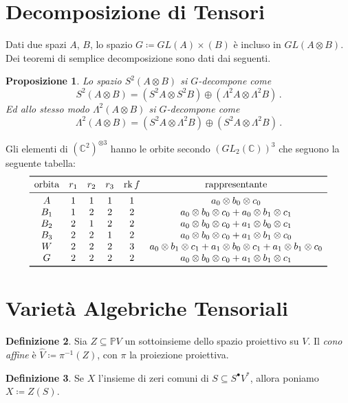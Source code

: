 \documentclass[a4paper, 11pt]{article}
\theoremstyle{definition}
\newtheorem{Def}{Definizione}[section]
\theoremstyle{plain}
\newtheorem{Prop}[Def]{Proposizione}
\newcommand{\PP}{\mathbb{P}}
\newcommand{\C}{\mathbb{C}}
\newcommand{\deff}{\coloneqq}
\DeclareMathOperator{\rk}{rk}
\begin{document}
\section{Decomposizione di Tensori}

Dati due spazi $A$, $B$, lo spazio $G \deff GL(A) \times (B)$ è incluso in $GL(A\otimes B)$. Dei teoremi di semplice decomposizione sono dati dai seguenti.
\begin{Prop}
	Lo spazio $S^2(A\otimes B)$ si $G$-decompone come
	\[
		S^2(A \otimes B) = (S^2A \otimes S^2B) \oplus (\Lambda^2A \otimes \Lambda^2B)\,.
	\]
	Ed allo stesso modo $\Lambda^2(A\otimes B)$ si $G$-decompone come
	\[
		\Lambda^2(A\otimes B) = (S^2A \otimes \Lambda^2B) \oplus (S^2A \otimes \Lambda^2B)\,.
	\]
\end{Prop} 

Gli elementi di $(\C^2)^{\otimes 3}$ hanno le orbite secondo $(GL_2(\C))^3$ che seguono la seguente tabella:
\[
\begin{array}{cccccc}
	\toprule
	\text{orbita} & r_1 & r_2 & r_3 &  \rk f & \text{rappresentante}\\
	\midrule
	A & 1 & 1 & 1 & 1 & a_0\otimes b_0 \otimes c_0 \\
	B_1 & 1 & 2 & 2 & 2 & a_0\otimes b_0 \otimes c_0 + a_0\otimes b_1 \otimes c_1\\
	B_2 & 2 & 1 & 2 & 2 & a_0\otimes b_0 \otimes c_0 + a_1\otimes b_0 \otimes c_1\\
	B_3 & 2 & 2 & 1 & 2 & a_0\otimes b_0 \otimes c_0 + a_1\otimes b_1 \otimes c_0\\
	W & 2 & 2 & 2 & 3 & a_0\otimes b_1 \otimes c_1 + a_1\otimes b_0 \otimes c_1 + a_1\otimes b_1 \otimes c_0\\
	G & 2 & 2 & 2 & 2 & a_0\otimes b_0 \otimes c_0 + a_1\otimes b_1 \otimes c_1 \\
	\bottomrule
\end{array}
\]
\section{Varietà Algebriche Tensoriali}
\begin{Def}
	Sia $Z \subseteq \PP V$ un sottoinsieme dello spazio proiettivo su $V$. Il \emph{cono affine} è $\hat{V} \deff \pi^{-1}(Z)$, con $\pi$ la proiezione proiettiva.
\end{Def}
\begin{Def}
	Se $X$ l'insieme di zeri comuni di $S \subseteq S^\bullet V^\ast$, allora poniamo $X \deff Z(S)$.
\end{Def}
\end{document}
